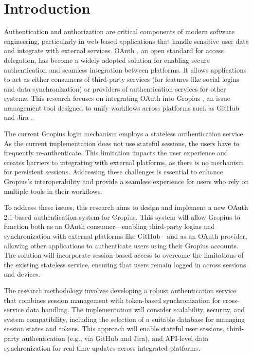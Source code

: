 
\chapter{Introduction}


Authentication and authorization are critical components of modern software engineering, particularly in web-based applications that handle sensitive user data and integrate with external services.
OAuth \cite{SINGH2022103091}, an open standard for access delegation, has become a widely adopted solution for enabling secure authentication and seamless integration between platforms.
It allows applications to act as either consumers of third-party services (for features like social logins and data synchronization) or providers of authentication services for other systems.
This research focuses on integrating OAuth into Gropius \cite{gropius}, an issue management tool designed to unify workflows across platforms such as GitHub and Jira \cite{Atlassian, GitHub}.

The current Gropius login mechanism employs a stateless authentication service. As the current implementation does not use stateful sessions, the users have to frequently re-authenticate. \cite{GropiusGitHub}
This limitation impacts the user experience and creates barriers to integrating with external platforms, as there is no mechanism for persistent sessions.
Addressing these challenges is essential to enhance Gropius’s interoperability and provide a seamless experience for users who rely on multiple tools in their workflows.

To address these issues, this research aims to design and implement a new OAuth 2.1-based authentication system for Gropius.
This system will allow Gropius to function both as an OAuth consumer—enabling third-party logins and synchronization with external platforms like GitHub—and as an OAuth provider,
allowing other applications to authenticate users using their Gropius accounts.
The solution will incorporate session-based \cite{895139, 716693} access to overcome the limitations of the existing stateless service, ensuring that users remain logged in across sessions and devices.

The research methodology involves developing a robust authentication service that combines session management with token-based synchronization for cross-service data handling.
The implementation will consider scalability, security, and system compatibility, including the selection of a suitable database for managing session states and tokens.
This approach will enable stateful user sessions, third-party authentication (e.g., via GitHub and Jira),
and API-level data synchronization for real-time updates across integrated platforms.

